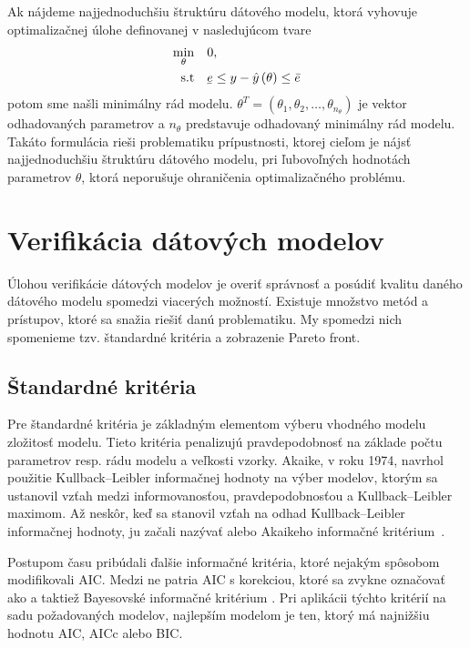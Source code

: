 Ak nájdeme najjednoduchšiu štruktúru dátového modelu, ktorá vyhovuje optimalizačnej úlohe definovanej v nasledujúcom tvare
\begin{equation}
	\begin{split}
		\min_{\theta} & \quad 0, \\
		\text{s.t} & \quad \ubar{e} \leq y - \hat{y}\left(\theta\right) \leq \bar{e}
	\end{split}
	\label{eq:GPE_m_order_est}
\end{equation}
potom sme našli minimálny rád modelu. $ \theta^T = (\theta_1, \theta_2, \dots, \theta_{n_\theta}) $ je vektor odhadovaných parametrov a $ n_\theta $ predstavuje odhadovaný minimálny rád modelu. Takáto formulácia rieši problematiku prípustnosti, ktorej cieľom je nájsť najjednoduchšiu štruktúru dátového modelu, pri ľubovoľných hodnotách parametrov $ \theta $, ktorá neporušuje ohraničenia optimalizačného problému.  

\section{Verifikácia dátových modelov}
Úlohou verifikácie dátových modelov je overiť správnosť a posúdiť kvalitu daného dátového modelu spomedzi viacerých možností. Existuje množstvo metód a prístupov, ktoré sa snažia riešiť danú problematiku. My spomedzi nich spomenieme tzv. štandardné kritéria a zobrazenie Pareto front.

\subsection{Štandardné kritéria}
Pre štandardné kritéria je základným elementom výberu vhodného modelu zložitosť modelu. Tieto kritéria penalizujú pravdepodobnosť na základe počtu parametrov resp. rádu modelu a veľkosti vzorky. Akaike, v roku 1974, navrhol použitie Kullback–Leibler informačnej hodnoty na výber modelov, ktorým sa ustanovil vzťah medzi informovanosťou, pravdepodobnosťou a Kullback–Leibler maximom. Až neskôr, keď sa stanovil vzťah na odhad  Kullback–Leibler informačnej hodnoty, ju začali nazývať  alebo Akaikeho informačné kritérium~\cite{emiliano:stand_crit:2014}. 

Postupom času pribúdali ďalšie informačné kritéria, ktoré nejakým spôsobom modifikovali AIC. Medzi ne patria AIC s korekciou, ktoré sa zvykne označovať ako  a taktiež Bayesovské informačné kritérium . Pri aplikácii týchto kritérií na sadu požadovaných modelov, najlepším modelom je ten, ktorý má najnižšiu hodnotu AIC, AICc alebo BIC.

